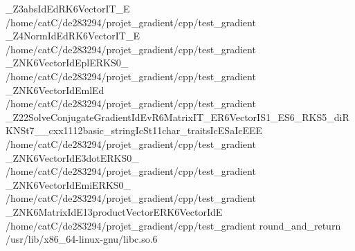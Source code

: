_Z3absIdEdRK6VectorIT_E	/home/catC/de283294/projet_gradient/cpp/test_gradient
_Z4NormIdEdRK6VectorIT_E	/home/catC/de283294/projet_gradient/cpp/test_gradient
_ZNK6VectorIdEplERKS0_	/home/catC/de283294/projet_gradient/cpp/test_gradient
_ZNK6VectorIdEmlEd	/home/catC/de283294/projet_gradient/cpp/test_gradient
_Z22SolveConjugateGradientIdEvR6MatrixIT_ER6VectorIS1_ES6_RKS5_diRKNSt7__cxx1112basic_stringIcSt11char_traitsIcESaIcEEE	/home/catC/de283294/projet_gradient/cpp/test_gradient
_ZNK6VectorIdE3dotERKS0_	/home/catC/de283294/projet_gradient/cpp/test_gradient
_ZNK6VectorIdEmiERKS0_	/home/catC/de283294/projet_gradient/cpp/test_gradient
_ZNK6MatrixIdE13productVectorERK6VectorIdE	/home/catC/de283294/projet_gradient/cpp/test_gradient
round_and_return	/usr/lib/x86_64-linux-gnu/libc.so.6
